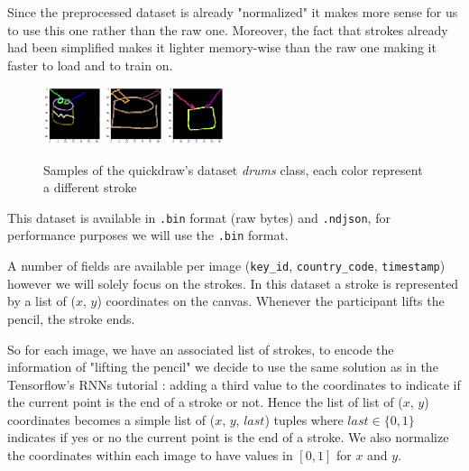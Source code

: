 \documentclass[10pt,twocolumn,letterpaper]{article}
\begin{document}
Since the preprocessed dataset is already "normalized" it makes more sense for us to use this one rather than the raw one. Moreover, the fact that strokes already had been simplified makes it lighter memory-wise than the raw one making it faster to load and to train on.


\begin{figure}[h] 
\centering
\includegraphics[width=0.15\textwidth]{images/drums_quickdraw_strokes_202.png}
\includegraphics[width=0.15\textwidth]{images/drums_quickdraw_strokes_25001.png}
\includegraphics[width=0.15\textwidth]{images/drums_quickdraw_strokes_25019.png}
\caption{Samples of the quickdraw's dataset \textit{drums} class, each color represent a different stroke}
\label{fig:drums_strokes}
\end{figure}

This dataset is available in \texttt{.bin} format (raw bytes) and \texttt{.ndjson}, for performance purposes we will use the \texttt{.bin} format.

A number of fields are available per image (\texttt{key\_id}, \texttt{country\_code}, \texttt{timestamp}) however we will solely focus on the strokes. In this dataset a stroke is represented by a list of ($x$, $y$) coordinates on the canvas. Whenever the participant lifts the pencil, the stroke ends.

So for each image, we have an associated list of strokes, to encode the information of "lifting the pencil" we decide to use the same solution as in the Tensorflow's RNNs tutorial \cite{TensorflowTutorial}: adding a third value to the coordinates to indicate if the current point is the end of a stroke or not. Hence the list of list of ($x$, $y$) coordinates becomes a simple list of ($x$, $y$, $last$) tuples where $last \in \{0, 1\}$ indicates if yes or no the current point is the end of a stroke. We also normalize the coordinates within each image to have values in $[0, 1]$ for $x$ and $y$.
\end{document}
